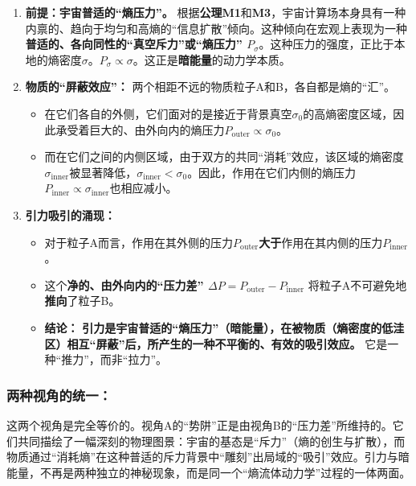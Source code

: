 \documentclass[11pt, a4paper]{article}
\begin{document}
\begin{enumerate}
    \item \textbf{前提：宇宙普适的“熵压力”。} 根据\textbf{公理M1}和\textbf{M3}，宇宙计算场本身具有一种内禀的、趋向于均匀和高熵的“信息扩散”倾向。这种倾向在宏观上表现为一种\textbf{普适的、各向同性的“真空斥力”或“熵压力” $P_\sigma$}。这种压力的强度，正比于本地的熵密度$\sigma$。$P_\sigma \propto \sigma$。这正是\textbf{暗能量}的动力学本质。

    \item \textbf{物质的“屏蔽效应”：} 两个相距不远的物质粒子A和B，各自都是熵的“汇”。
    \begin{itemize}
        \item 在它们各自的外侧，它们面对的是接近于背景真空$\sigma_0$的高熵密度区域，因此承受着巨大的、由外向内的熵压力$P_{\text{outer}} \propto \sigma_0$。
        \item 而在它们之间的内侧区域，由于双方的共同“消耗”效应，该区域的熵密度$\sigma_{\text{inner}}$被显著降低，$\sigma_{\text{inner}} < \sigma_0$。因此，作用在它们内侧的熵压力$P_{\text{inner}} \propto \sigma_{\text{inner}}$也相应减小。
    \end{itemize}

    \item \textbf{引力吸引的涌现：}
    \begin{itemize}
        \item 对于粒子A而言，作用在其外侧的压力$P_{\text{outer}}$\textbf{大于}作用在其内侧的压力$P_{\text{inner}}$。
        \item 这个\textbf{净的、由外向内的“压力差” $\Delta P = P_{\text{outer}} - P_{\text{inner}}$} 将粒子A不可避免地\textbf{推向}了粒子B。
        \item \textbf{结论：} \textbf{引力是宇宙普适的“熵压力”（暗能量），在被物质（熵密度的低洼区）相互“屏蔽”后，所产生的一种不平衡的、有效的吸引效应。} 它是一种“推力”，而非“拉力”。
    \end{itemize}
\end{enumerate}

\subsubsection*{两种视角的统一：}
这两个视角是完全等价的。视角A的“势阱”正是由视角B的“压力差”所维持的。它们共同描绘了一幅深刻的物理图景：宇宙的基态是“斥力”（熵的创生与扩散），而物质通过“消耗熵”在这种普适的斥力背景中“雕刻”出局域的“吸引”效应。引力与暗能量，不再是两种独立的神秘现象，而是同一个“熵流体动力学”过程的一体两面。
\end{document}

